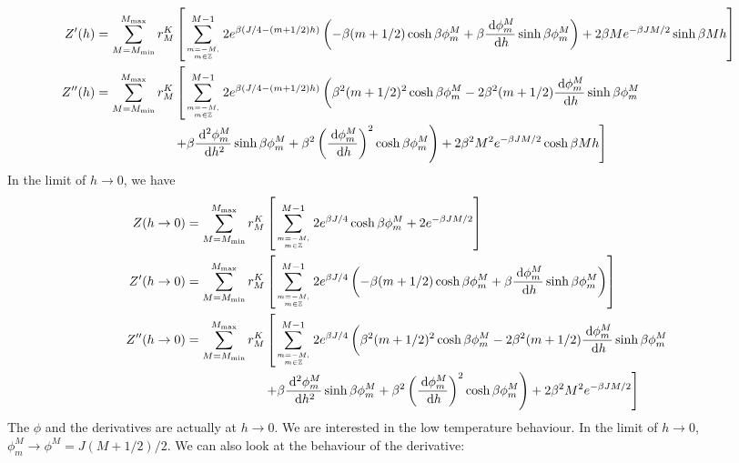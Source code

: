 \documentclass{revtex4-2}
\numberwithin{equation}{section}
\begin{document}
\begin{equation}\begin{aligned}
	Z^\prime(h) &=\sum_{M=M_\text{min}}^{M_\text{max}}r^K_M\left[\sum_{m=-M, \atop{m\in \mathbb{Z}}}^{M-1}2e^{\beta \left(J/4 - (m+1/2)h\right)}\left(-\beta (m+1/2) \cosh \beta\phi^M_m + \beta\frac{\:\mathrm{d}\phi^M_m}{\:\mathrm{d}h}\sinh \beta\phi^M_m\right)+ 2\beta Me^{-\beta JM/2}\sinh \beta Mh\right]\\
	Z^{\prime\prime}(h) &=\sum_{M=M_\text{min}}^{M_\text{max}}r^K_M\left[\sum_{m=-M, \atop{m\in \mathbb{Z}}}^{M-1}2 e^{\beta \left(J/4 - (m+1/2)h\right)}\left(\beta^2 (m+1/2)^2 \cosh \beta\phi^M_m - 2\beta^2 (m+1/2)\frac{\:\mathrm{d}\phi^M_m}{\:\mathrm{d}h}\sinh \beta\phi^M_m\right.\right.\\
			    &\quad\quad\quad\quad\quad\quad\left.\left. + \beta\frac{\:\mathrm{d^2}\phi^M_m}{\:\mathrm{d}h^2}\sinh \beta\phi^M_m + \beta^2\left(\frac{\:\mathrm{d}\phi^M_m}{\:\mathrm{d}h}\right)^2 \cosh \beta\phi^M_m\right) + 2\beta^2 M^2 e^{-\beta JM/2}\cosh \beta Mh\right]\\
\end{aligned}\end{equation}
In the limit of \(h \to 0\), we  have
\begin{equation}\begin{aligned}
	     Z(h \to 0) &=\sum_{M=M_\text{min}}^{M_\text{max}}r^K_M\left[\sum_{m=-M, \atop{m\in \mathbb{Z}}}^{M-1}2e^{\beta J/4}\cosh \beta\phi^M_m + 2e^{-\beta JM/2}\right]\\
	Z^\prime(h \to 0) &=\sum_{M=M_\text{min}}^{M_\text{max}}r^K_M\left[\sum_{m=-M, \atop{m\in \mathbb{Z}}}^{M-1}2e^{\beta J/4}\left(-\beta (m+1/2) \cosh \beta\phi^M_m + \beta\frac{\:\mathrm{d}\phi^M_m}{\:\mathrm{d}h}\sinh \beta\phi^M_m\right)\right]\\
	Z^{\prime\prime}(h \to 0) &=\sum_{M=M_\text{min}}^{M_\text{max}}r^K_M\left[\sum_{m=-M, \atop{m\in \mathbb{Z}}}^{M-1}2 e^{\beta J/4}\left(\beta^2 (m+1/2)^2 \cosh \beta\phi^M_m - 2\beta^2 (m+1/2)\frac{\:\mathrm{d}\phi^M_m}{\:\mathrm{d}h}\sinh \beta\phi^M_m\right.\right.\\
			    &\quad\quad\quad\quad\quad\quad\left.\left. + \beta\frac{\:\mathrm{d^2}\phi^M_m}{\:\mathrm{d}h^2}\sinh \beta\phi^M_m + \beta^2\left(\frac{\:\mathrm{d}\phi^M_m}{\:\mathrm{d}h}\right)^2 \cosh \beta\phi^M_m\right) + 2\beta^2 M^2 e^{-\beta JM/2}\right]\\
\end{aligned}\end{equation}
The \(\phi\) and the derivatives are actually at \(h\to 0\). We are interested in the low temperature behaviour. In the limit of \(h \to 0\), \(\phi_m^M \to \phi^M = J(M+1/2)/2\). We can also look at the behaviour of the derivative:
\end{document}
